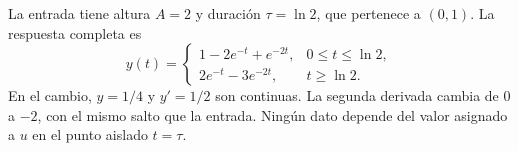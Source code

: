 La entrada tiene altura \(A=2\) y duración \(\tau=\ln2\), que pertenece a \((0,1)\). La respuesta completa es
\[
y(t)=
\begin{cases}
1-2e^{-t}+e^{-2t},&0\le t\le\ln2,\\
2e^{-t}-3e^{-2t},&t\ge\ln2.
\end{cases}
\]
En el cambio, \(y=1/4\) y \(y'=1/2\) son continuas. La segunda derivada cambia de \(0\) a \(-2\), con el mismo salto que la entrada. Ningún dato depende del valor asignado a \(u\) en el punto aislado \(t=\tau\).
